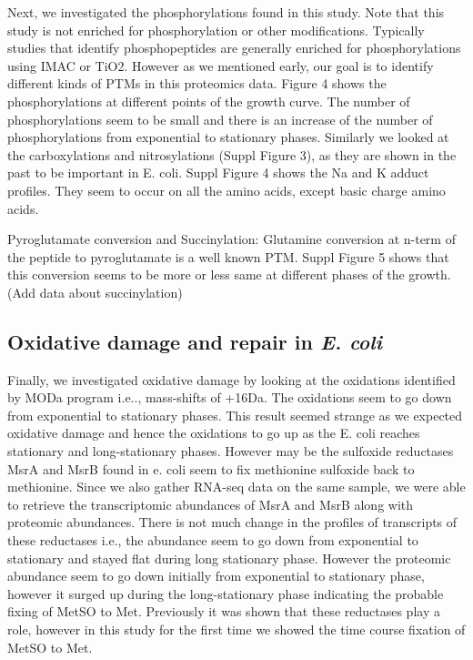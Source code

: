 \documentclass[12pt]{article}
\begin{document}
Next, we investigated the phosphorylations found in this study. Note that this study is not enriched for phosphorylation or other modifications. Typically studies that identify phosphopeptides are generally enriched for phosphorylations using IMAC or TiO2. However as we mentioned early, our goal is to identify different kinds of PTMs in this proteomics data. Figure 4 shows the phosphorylations at different points of the growth curve. The number of phosphorylations seem to be small and there is an increase of the number of phosphorylations from exponential to stationary phases. Similarly we looked at the carboxylations and nitrosylations (Suppl Figure 3), as they are shown in the past to be important in E. coli. Suppl Figure 4 shows the Na and K adduct profiles. They seem to occur on all the amino acids, except basic charge amino acids.

Pyroglutamate conversion and Succinylation:
Glutamine conversion at n-term of the peptide to pyroglutamate is a well known PTM. Suppl Figure 5 shows that this conversion seems to be more or less same at different phases of the growth. (Add data about succinylation)

\subsection{Oxidative damage and repair in \emph{E. coli}}
Finally, we investigated oxidative damage by looking at the oxidations identified by MODa program i.e.., mass-shifts of +16Da. The oxidations seem to go down from exponential to stationary phases. This result seemed strange as we expected oxidative damage and hence the oxidations to go up as the E. coli reaches stationary and long-stationary phases. However may be the sulfoxide reductases MsrA and MsrB found in e. coli seem to fix methionine sulfoxide back to methionine. Since we also gather RNA-seq data on the same sample, we were able to retrieve the transcriptomic abundances of MsrA and MsrB along with proteomic abundances. There is not much change in the profiles of transcripts of these reductases i.e., the abundance seem to go down from exponential to stationary and stayed flat during long stationary phase. However the proteomic abundance seem to go down initially from exponential to stationary phase, however it surged up during the long-stationary phase indicating the probable fixing of MetSO to Met. Previously it was shown that these reductases play a role, however in this study for the first time we showed the time course fixation of MetSO to Met.
\end{document}
